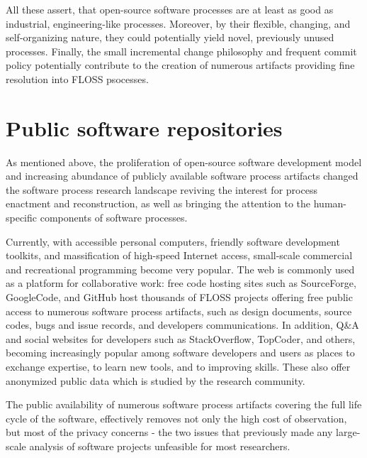 All these assert, that open-source software processes are at least as good as industrial, engineering-like 
processes. Moreover, by their flexible, changing, and self-organizing nature, they could potentially yield 
novel, previously unused processes. Finally, the small incremental change philosophy and frequent commit policy
potentially contribute to the creation of numerous artifacts providing fine resolution into FLOSS psocesses.


%
%
\section{Public software repositories}\label{section_public_repositories}
As mentioned above, the proliferation of open-source software development model and increasing abundance of 
publicly available software process artifacts changed the software process research landscape reviving the 
interest for process enactment and reconstruction, as well as bringing the attention to the human-specific 
components of software processes. 

Currently, with accessible personal computers, friendly software development toolkits, and massification of 
high-speed Internet access, small-scale commercial and recreational programming become very popular. 
The web is commonly used as a platform for collaborative work: free code hosting sites such as SourceForge, 
GoogleCode, and GitHub host thousands of FLOSS projects offering free public access to numerous software 
process artifacts, such as design documents, source codes, bugs and issue records, and developers communications.
In addition, Q\&A and social websites for developers such as StackOverflow, TopCoder, and others, becoming 
increasingly popular among software developers and users as places to exchange expertise, to learn new tools, 
and to improving skills. These also offer anonymized public data which is studied by the research community.

The public availability of numerous software process artifacts covering the full life cycle of the software,
effectively removes not only the high cost of observation, but most of the privacy concerns - the two issues 
that previously made any large-scale analysis of software projects unfeasible for most researchers.

